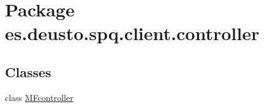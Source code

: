 \hypertarget{namespacees_1_1deusto_1_1spq_1_1client_1_1controller}{}\section{Package es.\+deusto.\+spq.\+client.\+controller}
\label{namespacees_1_1deusto_1_1spq_1_1client_1_1controller}
\subsection*{Classes}
\begin{DoxyCompactItemize}
\item 
class \hyperlink{classes_1_1deusto_1_1spq_1_1client_1_1controller_1_1_m_fcontroller}{M\+Fcontroller}
\end{DoxyCompactItemize}
